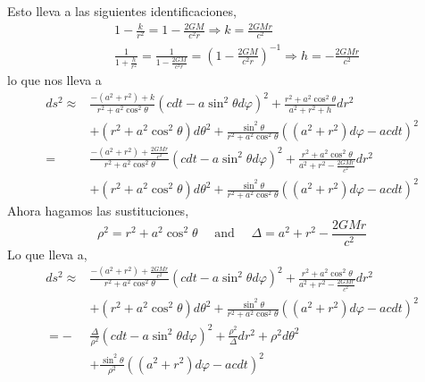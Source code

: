 Esto lleva a las siguientes identificaciones,
\begin{align}
     & 1-\frac{k}{r^2}=1-\frac{2 G M}{c^2 r} \Rightarrow k=\frac{2 G M r}{c^2}                                                              \\
     & \frac{1}{1+\frac{h}{r^2}}=\frac{1}{1-\frac{2 G M}{c^2 r}}=\left(1-\frac{2 G M}{c^2 r}\right)^{-1} \Rightarrow h=-\frac{2 G M r}{c^2}
\end{align}
lo que nos lleva a
\begin{align}
    d s^2 \approx & \frac{-\left(a^2+r^2\right)+k}{r^2+a^2 \cos ^2 \theta}\left(c d t-a \sin ^2 \theta d \varphi\right)^2+\frac{r^2+a^2 \cos ^2 \theta}{a^2+r^2+h} d r^2                                     \\
                  & +\left(r^2+a^2 \cos ^2 \theta\right) d \theta^2+\frac{\sin ^2 \theta}{r^2+a^2 \cos ^2 \theta}\left(\left(a^2+r^2\right) d \varphi-a c d t\right)^2                                       \\
    =             & \frac{-\left(a^2+r^2\right)+\frac{2 G M r}{c^2}}{r^2+a^2 \cos ^2 \theta}\left(c d t-a \sin ^2 \theta d \varphi\right)^2+\frac{r^2+a^2 \cos ^2 \theta}{a^2+r^2-\frac{2 G M r}{c^2}} d r^2 \\
                  & +\left(r^2+a^2 \cos ^2 \theta\right) d \theta^2+\frac{\sin ^2 \theta}{r^2+a^2 \cos ^2 \theta}\left(\left(a^2+r^2\right) d \varphi-a c d t\right)^2
\end{align}
Ahora hagamos las sustituciones,
$$
    \rho^2=r^2+a^2 \cos ^2 \theta \quad \text { and } \quad \Delta=a^2+r^2-\frac{2 G M r}{c^2}
$$
Lo que lleva a,
\begin{align}
    d s^2 \approx & \frac{-\left(a^2+r^2\right)+\frac{2 G M r}{c^2}}{r^2+a^2 \cos ^2 \theta}\left(c d t-a \sin ^2 \theta d \varphi\right)^2+\frac{r^2+a^2 \cos ^2 \theta}{a^2+r^2-\frac{2 G M r}{c^2}} d r^2 \\
                  & +\left(r^2+a^2 \cos ^2 \theta\right) d \theta^2+\frac{\sin ^2 \theta}{r^2+a^2 \cos ^2 \theta}\left(\left(a^2+r^2\right) d \varphi-a c d t\right)^2                                       \\
    =-            & \frac{\Delta}{\rho^2}\left(c d t-a \sin ^2 \theta d \varphi\right)^2+\frac{\rho^2}{\Delta} d r^2+\rho^2 d \theta^2                                                                       \\
                  & +\frac{\sin ^2 \theta}{\rho^2}\left(\left(a^2+r^2\right) d \varphi-a c d t\right)^2
\end{align}
